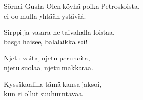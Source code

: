 \begin{song}{Sörnai Gusha}
    \showversenumber
    Olen köyhä poika Petroskoista,\\
    ei oo mulla yhtään ystävää.\\
	\begin{repetition}
        Sirppi ja vasara ne taivahalla loistaa,\\
        basga haisee, balalaikka soi!
	\end{repetition}
	
	\showversenumber
    Njetu voita, njetu perunoita,\\
    njetu suolaa, njetu makkaraa.\\
	\begin{repetition}
        Kyssäkaalilla tämä kansa jaksoi,\\
        kun ei ollut suuhunntavaa.
	\end{repetition}
	
\end{song}
